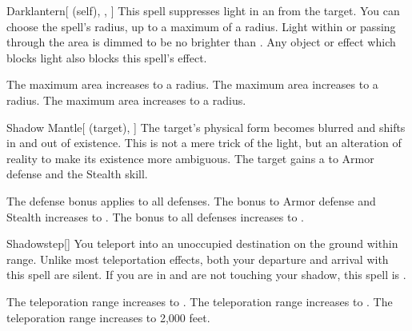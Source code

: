 \lowercase{\hypertarget{spell:Darklantern}{}}\label{spell:Darklantern}
\begin{attuneability}[Rank 1]{\hypertarget{spell:Darklantern}{Darklantern}}[ (self), , ]
This spell suppresses light in an  from the target.
You can choose the spell's radius, up to a maximum of a \areamed radius.
Light within or passing through the area is dimmed to be no brighter than .
Any object or effect which blocks light also blocks this spell's effect.

\rankline
{} The maximum area increases to a \arealarge radius.
 The maximum area increases to a \areahuge radius.
 The maximum area increases to a \areaext radius.
\end{attuneability}
\vspace{0.25em}



\lowercase{\hypertarget{spell:Shadow Mantle}{}}\label{spell:Shadow Mantle}
\begin{attuneability}[Rank 1]{\hypertarget{spell:Shadow Mantle}{Shadow Mantle}}[ (target), ]
The target's physical form becomes blurred and shifts in and out of existence.
This is not a mere trick of the light, but an alteration of reality to make its existence more ambiguous.
The target gains a   to Armor defense and the Stealth skill.

\rankline
{} The defense bonus applies to all defenses.
 The bonus to Armor defense and Stealth increases to .
 The bonus to all defenses increases to .
\end{attuneability}
\vspace{0.25em}



\lowercase{\hypertarget{spell:Shadowstep}{}}\label{spell:Shadowstep}
\begin{freeability}[Rank 1]{\hypertarget{spell:Shadowstep}{Shadowstep}}[]
You teleport into an unoccupied destination on the ground within \rngmed range.
Unlike most teleportation effects, both your departure and arrival with this spell are silent.
If you are in  and are not touching your shadow, this spell is .

\rankline
{} The teleporation range increases to \rnglong.
 The teleporation range increases to \rngext.
 The teleporation range increases to 2,000 feet.
\end{freeability}
\vspace{0.25em}



